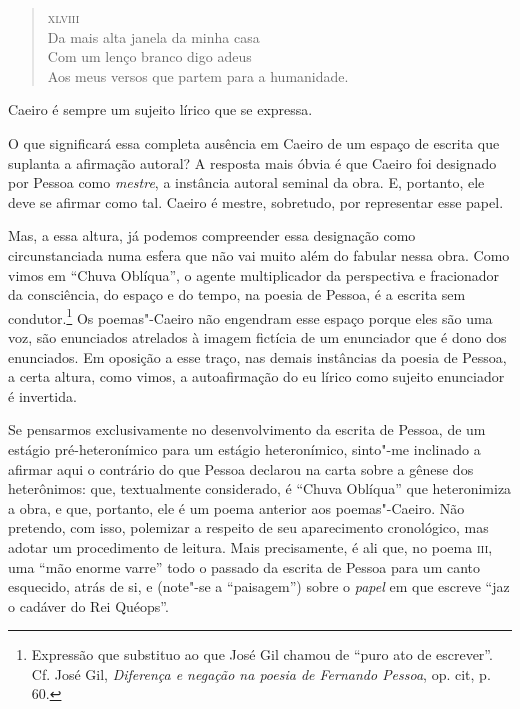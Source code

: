 \begin{verse}
\textsc{xlviii}\\[5pt]
Da mais alta janela da minha casa\\
Com um lenço branco digo adeus\\
Aos meus versos que partem para a \qb{}humanidade.
\end{verse}

Caeiro é sempre um sujeito lírico que se expressa.

O que significará essa completa ausência em Caeiro de um espaço de
escrita que suplanta a afirmação autoral? A resposta mais óbvia é que
Caeiro foi designado por Pessoa como \emph{mestre}, a instância autoral
seminal da obra. E, portanto, ele deve se afirmar como tal. Caeiro é
mestre, sobretudo, por representar esse papel.

Mas, a essa altura, já podemos compreender essa designação como
circunstanciada numa esfera que não vai muito além do fabular nessa
obra. Como vimos em ``Chuva Oblíqua'', o agente multiplicador da
perspectiva e fracionador da consciência, do espaço e do tempo, na
poesia de Pessoa, é a escrita sem condutor.\footnote{Expressão que
  substituo ao que José Gil chamou de ``puro ato de escrever''. Cf. José
  Gil, \emph{Diferença e negação na poesia de Fernando Pessoa}, op. cit,
  p. 60.} Os poemas"-Caeiro não engendram esse espaço porque eles são uma
voz, são enunciados atrelados à imagem fictícia de um enunciador que é
dono dos enunciados. Em oposição a esse traço, nas demais instâncias da
poesia de Pessoa, a certa altura, como vimos, a autoafirmação do eu
lírico como sujeito enunciador é invertida.

Se pensarmos exclusivamente no desenvolvimento da escrita de Pessoa, de
um estágio pré-heteronímico para um estágio heteronímico, sinto"-me
inclinado a afirmar aqui o contrário do que Pessoa declarou na carta
sobre a gênese dos heterônimos: que, textualmente considerado, é ``Chuva
Oblíqua'' que heteronimiza a obra, e que, portanto, ele é um poema
anterior aos poemas"-Caeiro. Não pretendo, com isso, polemizar a respeito
de seu aparecimento cronológico, mas adotar um procedimento de leitura.
Mais precisamente, é ali que, no poema \textsc{iii}, uma ``mão enorme
varre'' todo o passado da escrita de Pessoa para um canto esquecido,
atrás de si, e (note"-se a ``paisagem'') sobre o \emph{papel} em que
escreve ``jaz o cadáver do Rei Quéops''.

